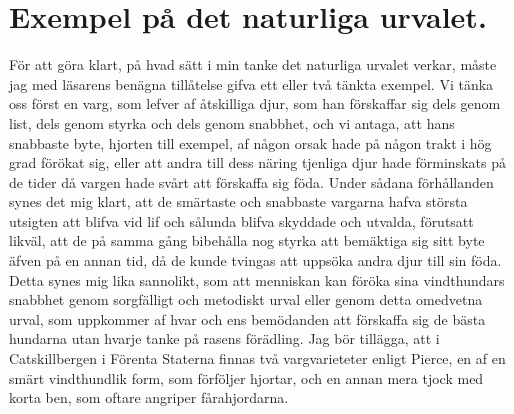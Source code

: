 \section{Exempel på det naturliga urvalet.}

För att göra klart, på hvad sätt i min tanke det naturliga urvalet verkar, måste jag med läsarens benägna tillåtelse gifva ett eller två tänkta exempel. Vi tänka oss först en varg, som lefver af åtskilliga djur, som han förskaffar sig dels genom list, dels genom styrka och dels genom snabbhet, och vi antaga, att hans snabbaste byte, hjorten till exempel, af någon orsak hade på någon trakt i hög grad förökat sig, eller att andra till dess näring tjenliga djur hade förminskats på de tider då vargen hade svårt att förskaffa sig föda. Under sådana förhållanden synes det mig klart, att de smärtaste och snabbaste vargarna hafva största utsigten att blifva vid lif och sålunda blifva skyddade och utvalda, förutsatt likväl, att de på samma gång bibehålla nog styrka att bemäktiga sig sitt byte äfven på en annan tid, då de kunde tvingas att uppsöka andra djur till sin föda. Detta synes mig lika sannolikt, som att menniskan kan föröka sina vindthundars snabbhet genom sorgfälligt och metodiskt urval eller genom detta omedvetna urval, som uppkommer af hvar och ens bemödanden att förskaffa sig de bästa hundarna utan hvarje tanke på rasens förädling. Jag bör tillägga, att i Catskillbergen i Förenta Staterna finnas två vargvarieteter enligt Pierce, en af en smärt vindthundlik form, som förföljer hjortar, och en annan mera tjock med korta ben, som oftare angriper fårahjordarna.

